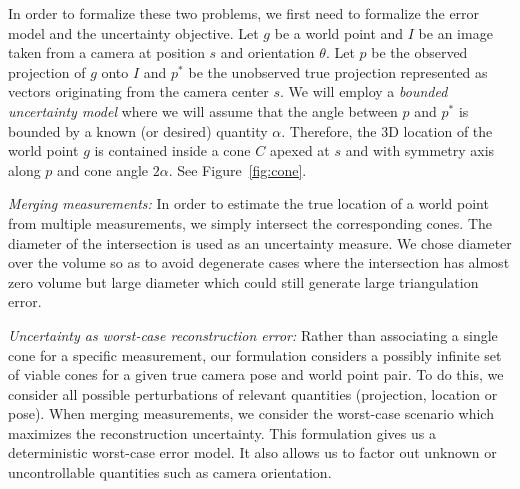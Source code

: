 In order to formalize these two problems, we first need to formalize
the error model and the uncertainty objective.  Let $g$ be a world point and $I$ be an
image taken from a camera at position $s$ and orientation $\theta$.
Let $p$ be the observed projection of $g$ onto $I$ and $p^*$ be the
unobserved true projection represented as vectors originating from the
camera center $s$. We will employ a {\em bounded uncertainty model}
where we will assume that the angle between $p$ and $p^*$ is bounded
by a known (or desired) quantity $\alpha$. 
Therefore, the 3D location
of the world point $g$ is contained inside a cone $C$ apexed at $s$
and with symmetry axis along $p$ and cone angle $2 \alpha$.
See Figure~\ref{fig:cone}.

\textit{Merging measurements:} In order to estimate the true location
of a world point from multiple measurements, we simply intersect the
corresponding cones. The diameter of the intersection is used as an
uncertainty measure. We chose diameter over the volume so as to avoid
degenerate cases where the intersection has almost zero volume but
large diameter which could still generate large triangulation error. 


\textit{Uncertainty as worst-case reconstruction error:} 
Rather than associating a single cone for a specific measurement, our formulation considers a possibly infinite set of viable cones for a given true camera pose and world point pair. To do this, we consider all possible perturbations of relevant quantities (projection, location or pose).
When merging measurements, we consider the worst-case scenario  which maximizes the reconstruction uncertainty. 
 This formulation gives us a deterministic worst-case error model. It also allows us to factor out unknown or uncontrollable quantities such as camera orientation.
 
